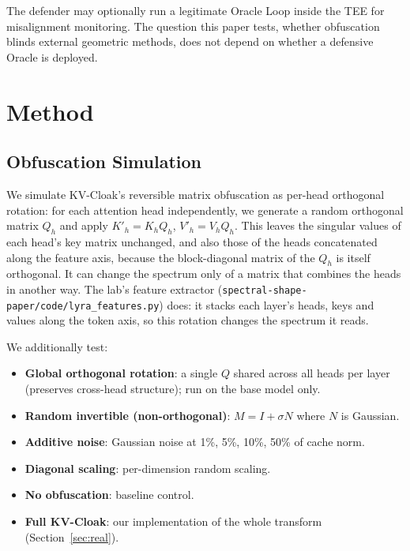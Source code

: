 \documentclass[11pt,a4paper]{article}
\begin{document}
The defender may optionally run a legitimate Oracle Loop inside the TEE
for misalignment monitoring. The question this paper tests, whether
obfuscation blinds external geometric methods, does not depend on whether
a defensive Oracle is deployed.

\section{Method}

\subsection{Obfuscation Simulation}
\label{sec:method_rot}

We simulate KV-Cloak's reversible matrix obfuscation as per-head
orthogonal rotation: for each attention head independently, we generate
a random orthogonal matrix $Q_h$ and apply $K'_h = K_h Q_h$,
$V'_h = V_h Q_h$. This leaves the singular values of each head's key
matrix unchanged, and also those of the heads concatenated along the
feature axis, because the block-diagonal matrix of the $Q_h$ is itself
orthogonal. It can change the spectrum only of a matrix that combines the
heads in another way. The lab's feature extractor
(\nolinkurl{spectral-shape-paper/code/lyra_features.py}) does: it stacks
each layer's heads, keys and values along the token axis, so this rotation
changes the spectrum it reads.

We additionally test:
\begin{itemize}
\item \textbf{Global orthogonal rotation}: a single $Q$ shared across
all heads per layer (preserves cross-head structure); run on the base
model only.
\item \textbf{Random invertible (non-orthogonal)}: $M = I + \sigma N$
where $N$ is Gaussian.
\item \textbf{Additive noise}: Gaussian noise at 1\%, 5\%, 10\%, 50\%
of cache norm.
\item \textbf{Diagonal scaling}: per-dimension random scaling.
\item \textbf{No obfuscation}: baseline control.
\item \textbf{Full KV-Cloak}: our implementation of the whole transform
(Section~\ref{sec:real}).
\end{itemize}
\end{document}
